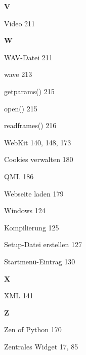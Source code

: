 \documentclass{book}
\renewcommand\indexspace{\vspace{11pt}}
\renewcommand\subitem{\par}
\begin{document}
\begin{multicols}{2}
\begin{osp-index}
  \indexspace
{\sffamily\bfseries V}\nopagebreak

  \item Video\hspace{1mm} 211

  \indexspace
{\sffamily\bfseries W}\nopagebreak

  \item WAV-Datei\hspace{1mm} 211
  \item wave\hspace{1mm} 213
    \subitem getparams()\hspace{1mm} 215
    \subitem open()\hspace{1mm} 215
    \subitem readframes()\hspace{1mm} 216
  \item WebKit\hspace{1mm} 140, 148, 173
    \subitem Cookies verwalten\hspace{1mm} 180
    \subitem QML\hspace{1mm} 186
    \subitem Webseite laden\hspace{1mm} 179
  \item Windows\hspace{1mm} 124
    \subitem Kompilierung\hspace{1mm} 125
    \subitem Setup-Datei erstellen\hspace{1mm} 127
    \subitem Startmen\"u-Eintrag\hspace{1mm} 130

  \indexspace
{\sffamily\bfseries X}\nopagebreak

  \item XML\hspace{1mm} 141

  \indexspace
{\sffamily\bfseries Z}\nopagebreak

  \item Zen of Python\hspace{1mm} 170
  \item Zentrales Widget\hspace{1mm} 17, 85

\end{osp-index}
\end{multicols}
\end{document}
